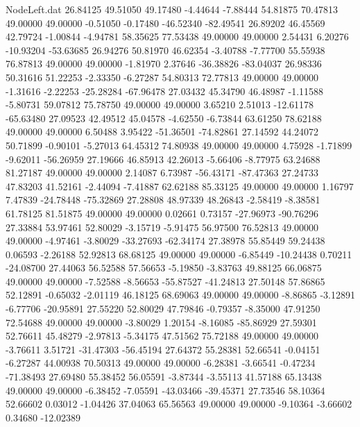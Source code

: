 \begin{filecontents}{NodeLeft.dat}
  26.84125   49.51050   49.17480    -4.44644   -7.88444   54.81875   70.47813   49.00000   49.00000   -0.51050   -0.17480  -46.52340  -82.49541
  26.89202   46.45569   42.79724    -1.00844   -4.94781   58.35625   77.53438   49.00000   49.00000    2.54431    6.20276  -10.93204  -53.63685
  26.94276   50.81970   46.62354    -3.40788   -7.77700   55.55938   76.87813   49.00000   49.00000   -1.81970    2.37646  -36.38826  -83.04037
  26.98336   50.31616   51.22253    -2.33350   -6.27287   54.80313   72.77813   49.00000   49.00000   -1.31616   -2.22253  -25.28284  -67.96478
  27.03432   45.34790   46.48987    -1.11588   -5.80731   59.07812   75.78750   49.00000   49.00000    3.65210    2.51013  -12.61178  -65.63480
  27.09523   42.49512   45.04578    -4.62550   -6.73844   63.61250   78.62188   49.00000   49.00000    6.50488    3.95422  -51.36501  -74.82861
  27.14592   44.24072   50.71899    -0.90101   -5.27013   64.45312   74.80938   49.00000   49.00000    4.75928   -1.71899   -9.62011  -56.26959
  27.19666   46.85913   42.26013    -5.66406   -8.77975   63.24688   81.27187   49.00000   49.00000    2.14087    6.73987  -56.43171  -87.47363
  27.24733   47.83203   41.52161    -2.44094   -7.41887   62.62188   85.33125   49.00000   49.00000    1.16797    7.47839  -24.78448  -75.32869
  27.28808   48.97339   48.26843    -2.58419   -8.38581   61.78125   81.51875   49.00000   49.00000    0.02661    0.73157  -27.96973  -90.76296
  27.33884   53.97461   52.80029    -3.15719   -5.91475   56.97500   76.52813   49.00000   49.00000   -4.97461   -3.80029  -33.27693  -62.34174
  27.38978   55.85449   59.24438     0.06593   -2.26188   52.92813   68.68125   49.00000   49.00000   -6.85449  -10.24438    0.70211  -24.08700
  27.44063   56.52588   57.56653    -5.19850   -3.83763   49.88125   66.06875   49.00000   49.00000   -7.52588   -8.56653  -55.87527  -41.24813
  27.50148   57.86865   52.12891    -0.65032   -2.01119   46.18125   68.69063   49.00000   49.00000   -8.86865   -3.12891   -6.77706  -20.95891
  27.55220   52.80029   47.79846    -0.79357   -8.35000   47.91250   72.54688   49.00000   49.00000   -3.80029    1.20154   -8.16085  -85.86929
  27.59301   52.76611   45.48279    -2.97813   -5.34175   47.51562   75.72188   49.00000   49.00000   -3.76611    3.51721  -31.47303  -56.45194
  27.64372   55.28381   52.66541    -0.04151   -6.27287   44.00938   70.50313   49.00000   49.00000   -6.28381   -3.66541   -0.47234  -71.38493
  27.69480   55.38452   56.05591    -3.87344   -3.55113   41.57188   65.13438   49.00000   49.00000   -6.38452   -7.05591  -43.03466  -39.45371
  27.73546   58.10364   52.66602     0.03012   -1.04426   37.04063   65.56563   49.00000   49.00000   -9.10364   -3.66602    0.34680  -12.02389

\end{filecontents}
